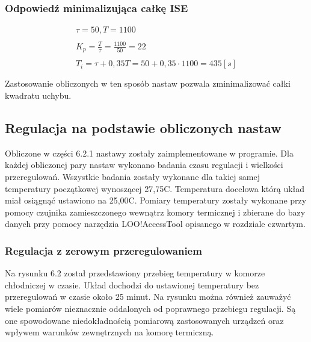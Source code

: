 \documentclass[oneside]{mgr}
\begin{document}
\subsubsection{Odpowiedź minimalizująca całkę ISE}
    \begin{equation*}
    \begin{array}{c}
     \tau = 50, T = 1100 \\ \\
    K_{p} = \frac{T}{\tau} = \frac{1100}{50} = 22 \\ \\
    T_{i} = \tau + 0,35T = 50 + 0,35 \cdot 1100 = 435[s]\\ \\
    \end{array}
    \end{equation*}
    Zastosowanie obliczonych w ten sposób nastaw pozwala zminimalizować całki kwadratu uchybu.


\subsection{Regulacja na podstawie obliczonych nastaw}
Obliczone w części 6.2.1 nastawy zostały zaimplementowane w programie. Dla każdej obliczonej pary nastaw wykonano badania czasu regulacji i wielkości przeregulowań. Wszystkie badania zostały wykonane dla takiej samej temperatury początkowej wynoszącej 27,75\textdegree{}C. Temperatura docelowa którą układ miał osiągnąć ustawiono na 25,00\textdegree{}C. Pomiary temperatury zostały wykonane przy pomocy czujnika zamieszczonego wewnątrz komory termicznej i zbierane do bazy danych przy pomocy narzędzia LOO!AccessTool opisanego w rozdziale czwartym.

\subsubsection{Regulacja z zerowym przeregulowaniem}
Na rysunku 6.2 został przedstawiony przebieg temperatury w komorze chłodniczej w czasie. Układ dochodzi do ustawionej temperatury bez przeregulowań w czasie około 25 minut. Na rysunku można również zauważyć wiele pomiarów nieznacznie oddalonych od poprawnego przebiegu regulacji. Są one spowodowane niedokładnością pomiarową zastosowanych urządzeń oraz wpływem warunków zewnętrznych na komorę termiczną.
\end{document}
